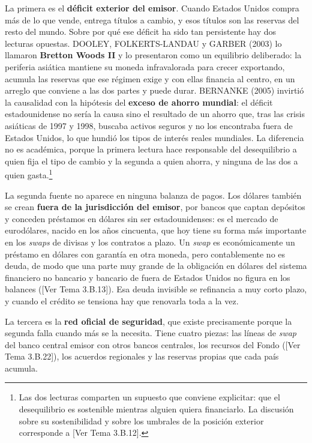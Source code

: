 \documentclass[10pt,a4paper]{article}
\newcommand{\authorfont}[1]{{\fontfamily{EBGaramond-TLF}\selectfont #1}}
\begin{document}
La primera es el \textbf{déficit exterior del emisor}. Cuando Estados Unidos compra más de lo que vende, entrega títulos a cambio, y esos títulos son las reservas del resto del mundo. Sobre por qué ese déficit ha sido tan persistente hay dos lecturas opuestas. DOOLEY, FOLKERTS-LANDAU y GARBER (2003) lo llamaron \textbf{Bretton Woods II} y lo presentaron como un equilibrio deliberado: la periferia asiática mantiene su moneda infravalorada para crecer exportando, acumula las reservas que ese régimen exige y con ellas financia al centro, en un arreglo que conviene a las dos partes y puede durar. BERNANKE (2005) invirtió la causalidad con la hipótesis del \textbf{exceso de ahorro mundial}: el déficit estadounidense no sería la causa sino el resultado de un ahorro que, tras las crisis asiáticas de 1997 y 1998, buscaba activos seguros y no los encontraba fuera de Estados Unidos, lo que hundió los tipos de interés reales mundiales. La diferencia no es académica, porque la primera lectura hace responsable del desequilibrio a quien fija el tipo de cambio y la segunda a quien ahorra, y ninguna de las dos a quien gasta.\footnote{%
    Las dos lecturas comparten un supuesto que conviene explicitar: que el desequilibrio es sostenible mientras alguien quiera financiarlo. La discusión sobre su sostenibilidad y sobre los umbrales de la posición exterior corresponde a [\authorfont{Ver Tema 3.B.12}].
}

La segunda fuente no aparece en ninguna balanza de pagos. Los dólares también se crean \textbf{fuera de la jurisdicción del emisor}, por bancos que captan depósitos y conceden préstamos en dólares sin ser estadounidenses: es el mercado de eurodólares, nacido en los años cincuenta, que hoy tiene su forma más importante en los \textit{swaps} de divisas y los contratos a plazo. Un \textit{swap} es económicamente un préstamo en dólares con garantía en otra moneda, pero contablemente no es deuda, de modo que una parte muy grande de la obligación en dólares del sistema financiero no bancario y bancario de fuera de Estados Unidos no figura en los balances ([\authorfont{Ver Tema 3.B.13}]). Esa deuda invisible se refinancia a muy corto plazo, y cuando el crédito se tensiona hay que renovarla toda a la vez.

La tercera es la \textbf{red oficial de seguridad}, que existe precisamente porque la segunda falla cuando más se la necesita. Tiene cuatro piezas: las líneas de \textit{swap} del banco central emisor con otros bancos centrales, los recursos del Fondo ([\authorfont{Ver Tema 3.B.22}]), los acuerdos regionales y las reservas propias que cada país acumula.
\end{document}
